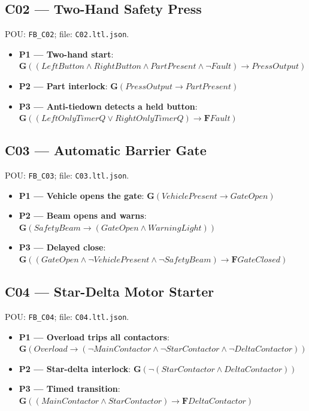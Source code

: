 \subsection*{C02 --- Two-Hand Safety Press}
\noindent POU: \texttt{FB\_C02}; file: \texttt{C02.ltl.json}.
\begin{small}
\begin{itemize}
\item \textbf{P1 --- Two-hand start}: $\mathbf{G}((LeftButton \wedge RightButton \wedge PartPresent \wedge \neg Fault) \rightarrow PressOutput)$
\item \textbf{P2 --- Part interlock}: $\mathbf{G}(PressOutput \rightarrow PartPresent)$
\item \textbf{P3 --- Anti-tiedown detects a held button}: $\mathbf{G}((LeftOnlyTimerQ \vee RightOnlyTimerQ) \rightarrow \mathbf{F} Fault)$
\end{itemize}
\end{small}

\subsection*{C03 --- Automatic Barrier Gate}
\noindent POU: \texttt{FB\_C03}; file: \texttt{C03.ltl.json}.
\begin{small}
\begin{itemize}
\item \textbf{P1 --- Vehicle opens the gate}: $\mathbf{G}(VehiclePresent \rightarrow GateOpen)$
\item \textbf{P2 --- Beam opens and warns}: $\mathbf{G}(SafetyBeam \rightarrow (GateOpen \wedge WarningLight))$
\item \textbf{P3 --- Delayed close}: $\mathbf{G}((GateOpen \wedge \neg VehiclePresent \wedge \neg SafetyBeam) \rightarrow \mathbf{F} GateClosed)$
\end{itemize}
\end{small}

\subsection*{C04 --- Star-Delta Motor Starter}
\noindent POU: \texttt{FB\_C04}; file: \texttt{C04.ltl.json}.
\begin{small}
\begin{itemize}
\item \textbf{P1 --- Overload trips all contactors}: $\mathbf{G}(Overload \rightarrow ( \neg MainContactor \wedge \neg StarContactor \wedge \neg DeltaContactor))$
\item \textbf{P2 --- Star-delta interlock}: $\mathbf{G}( \neg (StarContactor \wedge DeltaContactor))$
\item \textbf{P3 --- Timed transition}: $\mathbf{G}((MainContactor \wedge StarContactor) \rightarrow \mathbf{F} DeltaContactor)$
\end{itemize}
\end{small}

